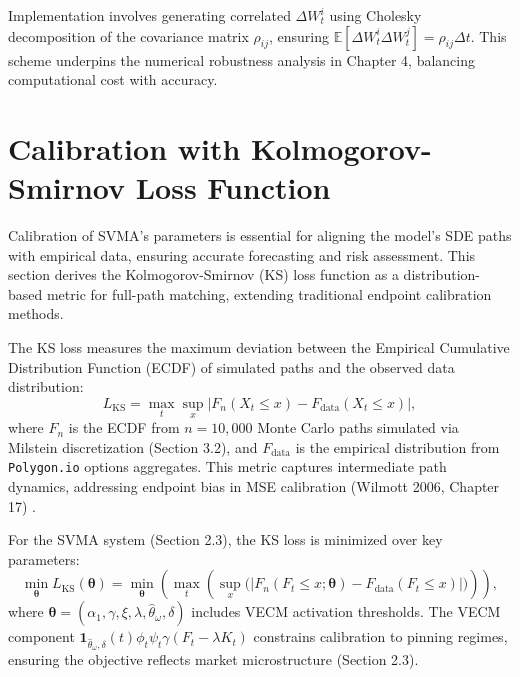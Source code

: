 \documentclass[12pt]{report}
\begin{document}
\vspace{0.2in}

Implementation involves generating correlated \(\Delta W_t^i\) using Cholesky decomposition of the covariance matrix \(\rho_{ij}\), ensuring \(\mathbb{E}[\Delta W_t^i \Delta W_t^j] = \rho_{ij} \Delta t\). This scheme underpins the numerical robustness analysis in Chapter 4, balancing computational cost with accuracy.

\section{Calibration with Kolmogorov-Smirnov Loss Function}

Calibration of SVMA's parameters is essential for aligning the model's SDE paths with empirical data, ensuring accurate forecasting and risk assessment. This section derives the Kolmogorov-Smirnov (KS) loss function as a distribution-based metric for full-path matching, extending traditional endpoint calibration methods.

\vspace{0.2in}

The KS loss measures the maximum deviation between the Empirical Cumulative Distribution Function (ECDF) of simulated paths and the observed data distribution:
\[
    L_{\text{KS}} = \max_t \sup_x \left| F_n(X_t \leq x) - F_{\text{data}}(X_t \leq x) \right|,
\]
where \(F_n\) is the ECDF from \(n = 10,000\) Monte Carlo paths simulated via Milstein discretization (Section 3.2), and \(F_{\text{data}}\) is the empirical distribution from \texttt{Polygon.io} options aggregates. This metric captures intermediate path dynamics, addressing endpoint bias in MSE calibration (Wilmott 2006, Chapter 17) \cite{wilmott2006}.

\vspace{0.2in}

For the SVMA system (Section 2.3), the KS loss is minimized over key parameters:
\[
    \min_{\boldsymbol{\theta}} L_{\text{KS}}(\boldsymbol{\theta}) = \min_{\boldsymbol{\theta}} \left(\max_t \left(\sup_x \Big( \left| F_n(F_t \leq x; \boldsymbol{\theta}) - F_{\text{data}}(F_t \leq x) \right|\Big)\right)\right),
\]
where \(\boldsymbol{\theta} = (\alpha_1, \gamma, \xi, \lambda, \hat{\theta}_\omega, \delta)\) includes VECM activation thresholds. The VECM component \(\mathbf{1}_{\hat{\theta}_\omega, \delta}(t) \phi_t \psi_t \gamma (F_t - \lambda K_t)\) constrains calibration to pinning regimes, ensuring the objective reflects market microstructure (Section 2.3).
\end{document}
